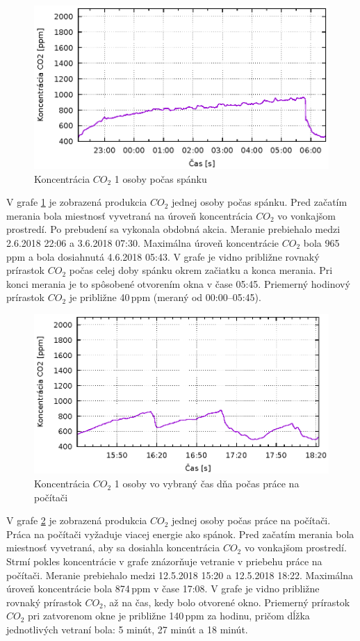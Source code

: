 \begin{figure}[H]
	\centering
	\includegraphics[width=350pt]{images/1clovekNocCO2.eps} 
	\caption{Koncentrácia $CO_2$ 1 osoby počas spánku}
	\label{img1osobaNoc}
\end{figure}
V grafe \ref{img1osobaNoc} je zobrazená produkcia $CO_2$ jednej osoby počas spánku. Pred začatím merania bola miestnosť vyvetraná na úroveň koncentrácia $CO_2$ vo vonkajšom prostredí. Po prebudení sa vykonala obdobná akcia. Meranie prebiehalo medzi 2.6.2018 22:06 a 3.6.2018 07:30. Maximálna úroveň koncentrácie $CO_2$ bola 965\,ppm a bola dosiahnutá 4.6.2018 05:43. V grafe je vidno približne rovnaký prírastok $CO_2$ počas celej doby spánku okrem začiatku a konca merania. Pri konci merania je to spôsobené otvorením okna v čase 05:45. Priemerný hodinový prírastok $CO_2$ je približne 40\,ppm (meraný od 00:00--05:45).

\begin{figure}[H]
	\centering
	\includegraphics[width=350pt]{images/1clovekDennaAktivitaCO2.eps} 
	\caption{Koncentrácia $CO_2$ 1 osoby vo vybraný čas dňa počas práce na počítači}
	\label{img1osobaDen}
\end{figure}
V grafe \ref{img1osobaDen} je zobrazená produkcia $CO_2$ jednej osoby počas práce na počítači. Práca na počítači vyžaduje viacej energie ako spánok. Pred začatím  merania bola miestnosť vyvetraná, aby sa dosiahla koncentrácia $CO_2$ vo vonkajšom prostredí. Strmí pokles koncentrácie v grafe znázorňuje vetranie v priebehu práce na počítači. Meranie prebiehalo medzi 12.5.2018 15:20 a 12.5.2018 18:22. Maximálna úroveň koncentrácie bola 874\,ppm v čase 17:08. V grafe je vidno približne rovnaký prírastok $CO_2$, až na čas, kedy bolo otvorené okno. Priemerný prírastok $CO_2$ pri zatvorenom okne je približne 140\,ppm za hodinu, pričom dĺžka jednotlivých vetraní bola: 5 minút, 27 minút a 18 minút.

